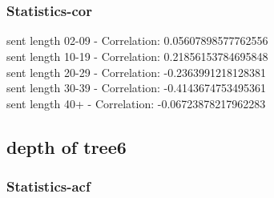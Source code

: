\documentclass{article}%
\begin{document}
\begin{figure}[ht]%
\centering%
\setlength{\abovecaptionskip}{-35pt}%
%
%
\\%
%
%
\\%
%
\end{figure}

%
\newpage%
\subsubsection{Statistics{-}cor}%
\label{ssubsec:Statistics{-}cor}%
\noindent%
sent length 02-09 - Correlation: 0.05607898577762556\\%
sent length 10-19 - Correlation: 0.21856153784695848\\%
sent length 20-29 - Correlation: -0.2363991218128381\\%
sent length 30-39 - Correlation: -0.4143674753495361\\%
sent length 40+ - Correlation: -0.06723878217962283\\

%
\newpage

%
\subsection{depth of tree6}%
\label{subsec:depthoftree6}%
\subsubsection{Statistics{-}acf}%
\label{ssubsec:Statistics{-}acf}%
\end{document}
